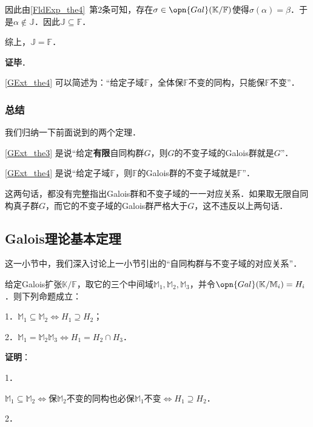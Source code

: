 因此由\autoref{FldExp_the4}~第2条可知，存在$\sigma\in\opn{Gal}(\mathbb{K}/\mathbb{F})$使得$\sigma(\alpha)=\beta$．于是$\alpha\not\in \mathbb{J}$．因此$\mathbb{J}\subseteq\mathbb{F}$．

综上，$\mathbb{J}=\mathbb{F}$．

\textbf{证毕}．


\autoref{GExt_the4} 可以简述为：“给定子域$\mathbb{F}$，全体保$\mathbb{F}$不变的同构，只能保$\mathbb{F}$不变”．




\subsubsection{总结}

我们归纳一下前面说到的两个定理．

\autoref{GExt_the3} 是说“给定\textbf{有限}自同构群$G$，则$G$的不变子域的Galois群就是$G$”．

\autoref{GExt_the4} 是说“给定子域$\mathbb{F}$，则$\mathbb{F}$的Galois群的不变子域就是$\mathbb{F}$”．


这两句话，都没有完整指出Galois群和不变子域的一一对应关系．如果取无限自同构真子群$G$，而它的不变子域的Galois群严格大于$G$，这不违反以上两句话．








\subsection{Galois理论基本定理}\label{GExt_sub1}

这一小节中，我们深入讨论上一小节引出的“自同构群与不变子域的对应关系”．


\begin{lemma}{}
给定Galois扩张$\mathbb{K}/\mathbb{F}$，取它的三个中间域$\mathbb{M}_1, \mathbb{M}_2, \mathbb{M}_3$，并令$\opn{Gal}(\mathbb{K}/\mathbb{M}_i)=H_i$．则下列命题成立：

1．$\mathbb{M}_1\subseteq \mathbb{M}_2 \iff H_1\supseteq H_2$；

2．$\mathbb{M}_1=\mathbb{M}_2\mathbb{M}_3 \iff H_1=H_2\cap H_3$．
\end{lemma}

\textbf{证明}：

1．

$\mathbb{M}_1\subseteq\mathbb{M}_2 \iff$保$\mathbb{M}_2$不变的同构也必保$\mathbb{M}_1$不变$\iff H_1\supseteq H_2$．

2．

